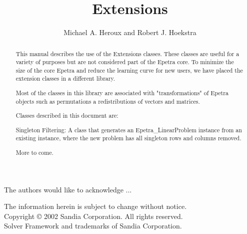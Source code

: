 \documentclass[11pt,twoside,titlepage]{EpetraDoc}
\title{\Epetra{} Extensions}
\author{Michael A. Heroux and Robert J. Hoekstra}
\begin{document}

\maketitle


\begin{abstract}

This manual describes the use of the \Epetra{} Extensions classes.  These classes
are useful for a variety of purposes but are not considered part of the Epetra core.
To minimize the size of the core Epetra and reduce the learning curve for new users,
we have placed the extension classes in a different library.

Most of the classes in this library are associated with "transformations" of 
Epetra objects such as permutations a redistributions of vectors and matrices.

Classes described in this document are:
\begin{EpetraItemize}

\item Singleton Filtering:  A class that generates an Epetra\_LinearProblem instance
from an existing instance, where the new problem has all singleton rows and columns
removed.
\item More to come.

\end{EpetraItemize}

\end{abstract}

\clearpage
{}
The authors would like to acknowledge ...

The information herein is subject to change without notice.\\[1em]
Copyright \copyright{} 2002 Sandia Corporation.  All rights reserved.\\[1em]
\EpetraTM{} Solver Framework and \EpetraTM{} trademarks of Sandia
Corporation.\\[1em]
\end{document}
